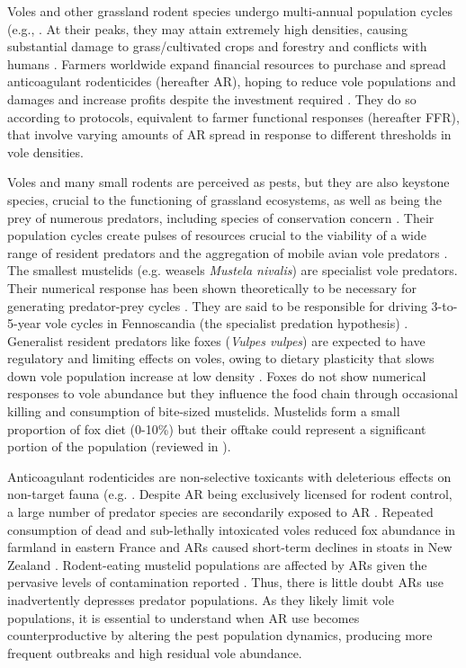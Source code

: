 \documentclass[11pt]{article}
\begin{document}
Voles and other grassland rodent species undergo multi-annual population cycles (e.g.,  \cite{Krebs2013}. At their peaks, they may attain extremely high densities, causing substantial damage to grass/cultivated crops and forestry and conflicts with humans \citep{Delattre2009}. Farmers worldwide expand financial resources to purchase and spread anticoagulant rodenticides (hereafter AR), hoping to reduce vole populations and damages and increase profits despite the investment required \citep{Stenseth2003}. They do so according to protocols, equivalent to farmer functional responses (hereafter FFR), that involve varying amounts of AR spread in response to different thresholds in vole densities. 

Voles and many small rodents are perceived as pests, but they are also keystone species, crucial to the functioning of grassland ecosystems, as well as being the prey of numerous predators, including species of conservation concern \citep{Delibes-Mateos2011, Coeurdassier2014}. Their population cycles create pulses of resources crucial to the viability of a wide range of resident predators and the aggregation of mobile avian vole predators \citep{Korpimaki1991}. The smallest mustelids (e.g. weasels \textit{Mustela nivalis}) are specialist vole predators. Their numerical response has been shown theoretically to be necessary for generating predator-prey cycles \citep{Hanski1991}. They are said to be responsible for driving 3-to-5-year vole cycles in Fennoscandia (the specialist predation hypothesis) \citet{Hanski1991}. Generalist resident predators like foxes (\textit{Vulpes vulpes}) are expected to have regulatory and limiting effects on voles, owing to dietary plasticity that slows down vole population increase at low density \citet{Hanski1991}. Foxes do not show numerical responses to vole abundance \citep{Weber2002} but they influence the food chain through occasional killing and consumption of bite-sized mustelids. Mustelids form a small proportion of fox diet (0-10\%) but their offtake could represent a significant portion of the population (reviewed in \citet{Lambin2018}).

Anticoagulant rodenticides are non-selective toxicants with deleterious effects on non-target fauna (e.g. \cite{Coeurdassier2014}. Despite AR being exclusively licensed for rodent control, a large number of predator species are secondarily exposed to AR \citep{Sanchez-Barbudo2012}. Repeated consumption of dead and sub-lethally intoxicated voles reduced fox abundance in farmland in eastern France \citep{Jacquot2013} and ARs caused short-term declines in stoats in New Zealand \citep{Alterio1996}. Rodent-eating mustelid populations are affected by ARs given the pervasive levels of contamination reported \citep{McDonald1998}. Thus, there is little doubt ARs use inadvertently depresses predator populations. As they likely limit vole populations, it is essential to understand when AR use becomes counterproductive by altering the pest population dynamics, producing more frequent outbreaks and high residual vole abundance.
\end{document}
